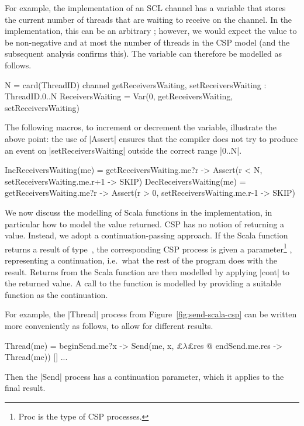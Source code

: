 For example, the implementation of an SCL channel has a variable
 that stores the current number of threads that are
waiting to receive on the channel.  In the implementation, this can be an
arbitrary ; however, we would expect the value to be non-negative
and at most the number of threads in the CSP model (and the subsequent
analysis confirms this).  The variable can therefore be modelled as follows.
%
\begin{cspm}
N = card(ThreadID)
channel getReceiversWaiting, setReceiversWaiting : ThreadID.{0..N}
ReceiversWaiting = Var(0, getReceiversWaiting, setReceiversWaiting)
\end{cspm}
%
The following macros, to increment or decrement the 
variable, illustrate the above point: the use of |Assert| ensures that the
compiler does not try to produce an event on |setReceiversWaiting| outside the
correct range |{0..N}|.
%
\begin{cspm}
IncReceiversWaiting(me) =
  getReceiversWaiting.me?r -> Assert(r < N, setReceiversWaiting.me.r+1 -> SKIP)
DecReceiversWaiting(me) = 
  getReceiversWaiting.me?r -> Assert(r > 0, setReceiversWaiting.me.r-1 -> SKIP)
\end{cspm}

We now discuss the modelling of Scala functions in the implementation, in
particular how to model the value returned.  CSP has no notion of returning a
value.  Instead, we adopt a continuation-passing approach.  If the Scala
function returns a result of type~, the corresponding CSP process is
given a parameter\footnote{{\cspmstyle Proc} is the type of CSP processes.}
, representing a continuation, i.e.~what the rest of
the program does with the result.  Returns from the Scala function are then
modelled by applying |cont| to the returned value.  A call to the function is
modelled by providing a suitable function as the continuation.

For example, the |Thread| process from Figure~\ref{fig:send-scala-csp} can be
written more conveniently as follows, to allow for different results.
\begin{cspm}
Thread(me) = beginSend.me?x -> Send(me, x, £$\lambda$£res @ endSend.me.res -> Thread(me))  [] ...
\end{cspm}
%
Then the |Send| process has a continuation parameter, which it applies to the
final result.

